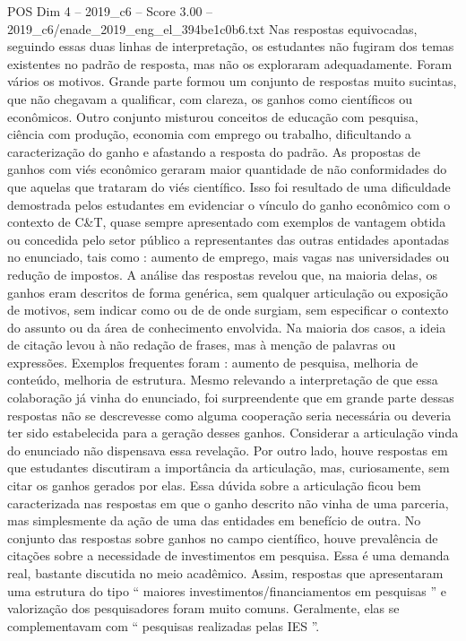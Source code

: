 \begin{textsample}{POS Dim 4 – 2019\_c6 – Score 3.00 – 2019\_c6/enade\_2019\_eng\_el\_394be1c0b6.txt}
Nas respostas equivocadas, seguindo essas duas linhas de interpretação, os estudantes não fugiram dos temas existentes no padrão de resposta, mas não os exploraram adequadamente.
Foram vários os motivos.
Grande parte formou um conjunto de respostas muito sucintas, que não chegavam a qualificar, com clareza, os ganhos como científicos ou econômicos.
Outro conjunto misturou conceitos de educação com pesquisa, ciência com produção, economia com emprego ou trabalho, dificultando a caracterização do ganho e afastando a resposta do padrão.
As propostas de ganhos com viés econômico geraram maior quantidade de não conformidades do que aquelas que trataram do viés científico.
Isso foi resultado de uma dificuldade demostrada pelos estudantes em evidenciar o vínculo do ganho econômico com o contexto de C\&T, quase sempre apresentado com exemplos de vantagem obtida ou concedida pelo setor público a representantes das outras entidades apontadas no enunciado, tais como : aumento de emprego, mais vagas nas universidades ou redução de impostos.
A análise das respostas revelou que, na maioria delas, os ganhos eram descritos de forma genérica, sem qualquer articulação ou exposição de motivos, sem indicar como ou de de onde surgiam, sem especificar o contexto do assunto ou da área de conhecimento envolvida.
Na maioria dos casos, a ideia de citação levou à não redação de frases, mas à menção de palavras ou expressões.
Exemplos frequentes foram : aumento de pesquisa, melhoria de conteúdo, melhoria de estrutura.
Mesmo relevando a interpretação de que essa colaboração já vinha do enunciado, foi surpreendente que em grande parte dessas respostas não se descrevesse como alguma cooperação seria necessária ou deveria ter sido estabelecida para a geração desses ganhos.
Considerar a articulação vinda do enunciado não dispensava essa revelação.
Por outro lado, houve respostas em que estudantes discutiram a importância da articulação, mas, curiosamente, sem citar os ganhos gerados por elas.
Essa dúvida sobre a articulação ficou bem caracterizada nas respostas em que o ganho descrito não vinha de uma parceria, mas simplesmente da ação de uma das entidades em benefício de outra.
No conjunto das respostas sobre ganhos no campo científico, houve prevalência de citações sobre a necessidade de investimentos em pesquisa.
Essa é uma demanda real, bastante discutida no meio acadêmico.
Assim, respostas que apresentaram uma estrutura do tipo “ maiores investimentos/financiamentos em pesquisas ” e valorização dos pesquisadores foram muito comuns.
Geralmente, elas se complementavam com “ pesquisas realizadas pelas IES ”.

\end{textsample}
